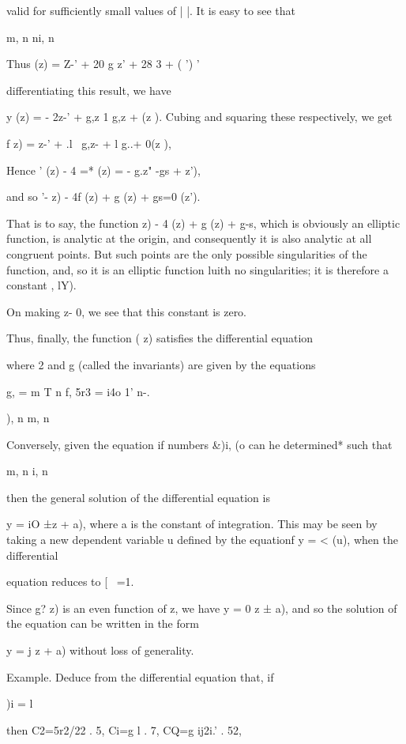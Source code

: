 {valid for sufficiently small values of | |. It is easy to see that

m, n ni, n

Thus (z) = Z-' + 20 g z' + 28 3 + ( ') '

differentiating this result, we have

 y (z) = - 2z-' + g,z 1 g,z + (z ). Cubing and squaring these
respectively, we get

f z) = z-' + .l~ g,z- + l g..+ 0(z ),

Hence ' (z) - 4 =* (z) = - g.z" -gs + z'),

and so '- z) - 4f (z) + g (z) + gs=0 (z').

That is to say, the function z) - 4 (z) + g (z) + g-s, which is
obviously an elliptic function, is analytic at the origin, and
consequently it is also analytic at all congruent points. But such
points are the only possible singularities of the function, and, so it
is an elliptic function luith no singularities; it is therefore a
constant , lY).

On making z- 0, we see that this constant is zero.

%
%

Thus, finally, the function ( z) satisfies the differential equation

where 2 and g (called the invariants) are given by the equations

g, = m T n f, 5r3 = i4o 1' n-.

), n m, n

Conversely, given the equation if numbers \&)i, (o can he determined*
such that

m, n i, n

then the general solution of the differential equation is

y = iO ±z + a), where a is the constant of integration. This may be
seen by taking a new dependent variable u defined by the equationf y =
< (u), when the differential

equation reduces to [ \ =1.

Since g? z) is an even function of z, we have y = 0 z ± a), and so the
solution of the equation can be written in the form

y = j z + a) without loss of generality.

Example. Deduce from the differential equation that, if

)i = l

then C2=5r2/22 . 5, Ci=g l . 7, CQ=g ij2i.' . 52,

}
